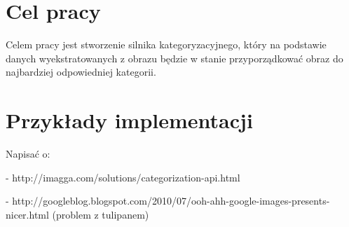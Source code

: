 
\section*{Cel pracy}

Celem pracy jest stworzenie silnika kategoryzacyjnego, który na podstawie danych wyekstratowanych z obrazu będzie w stanie przyporządkować obraz do najbardziej odpowiedniej kategorii.

\section*{Przykłady implementacji}
Napisać o:

- http://imagga.com/solutions/categorization-api.html

- http://googleblog.blogspot.com/2010/07/ooh-ahh-google-images-presents-nicer.html (problem z tulipanem)